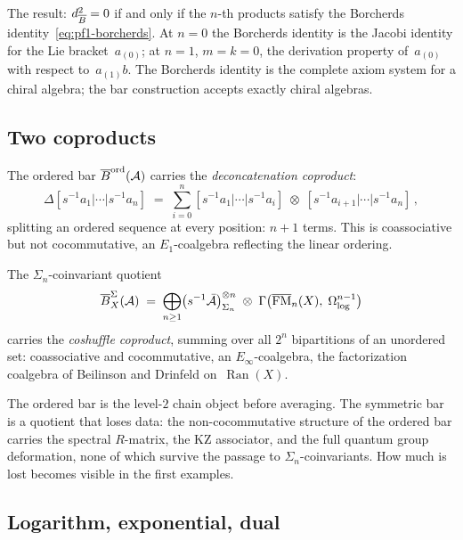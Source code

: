 The result: $d_{\overline{B}}^2 = 0$ if and only if the $n$-th products
satisfy the Borcherds identity~\eqref{eq:pf1-borcherds}. At $n=0$
the Borcherds identity is the Jacobi identity for the Lie
bracket~$a_{(0)}$; at $n=1$, $m=k=0$, the derivation property
of~$a_{(0)}$ with respect to~$a_{(1)}b$. The Borcherds identity is
the complete axiom system for a chiral algebra; the bar construction
accepts exactly chiral algebras.


\subsection*{Two coproducts}

The ordered bar $\overline{B}^{\mathrm{ord}}(\mathcal{A})$ carries the
\emph{deconcatenation coproduct}:
\begin{equation}\label{eq:pf1-deconc}
\Delta[s^{-1}a_1|\cdots|s^{-1}a_n]
\;=\;
\sum_{i=0}^{n}
[s^{-1}a_1|\cdots|s^{-1}a_i]
\;\otimes\;
[s^{-1}a_{i+1}|\cdots|s^{-1}a_n]\,,
\end{equation}
splitting an ordered sequence at every position: $n+1$ terms.
This is coassociative but not cocommutative, an
$E_1$-coalgebra reflecting the linear ordering.

The $\Sigma_n$-coinvariant quotient
\[
\overline{B}^{\Sigma}_X(\mathcal{A})
\;=\;
\bigoplus_{n\ge 1}
\bigl(s^{-1}\bar{\mathcal{A}}\bigr)^{\otimes n}_{\Sigma_n}
\;\otimes\;
\Gamma\bigl(\overline{\mathrm{FM}}_n(X),\;
\Omega^{n-1}_{\log}\bigr)
\]
carries the \emph{coshuffle coproduct}, summing over all $2^n$
bipartitions of an unordered set: coassociative and cocommutative,
an $E_\infty$-coalgebra, the factorization coalgebra of Beilinson
and Drinfeld on~$\operatorname{Ran}(X)$.

The ordered bar is the level-$2$ chain object before averaging. The symmetric bar is a
quotient that loses data: the non-cocommutative structure of the
ordered bar carries the spectral $R$-matrix, the KZ associator, and
the full quantum group deformation, none of which survive the
passage to $\Sigma_n$-coinvariants. How much is lost becomes
visible in the first examples.


\subsection*{Logarithm, exponential, dual}

